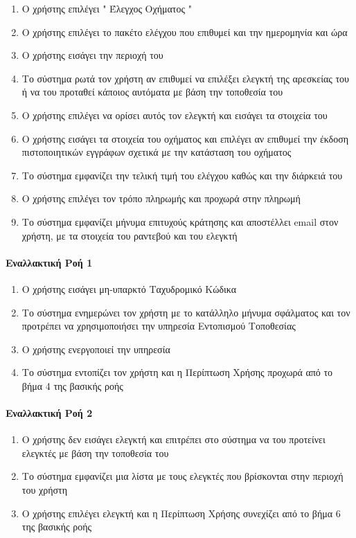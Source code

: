 \documentclass{../ol-softwaremanual}
\begin{document}
	\begin{enumerate}
		\item Ο χρήστης επιλέγει \en " \gr Έλεγχος Οχήματος \en " \gr
		\item Ο χρήστης επιλέγει το πακέτο ελέγχου που επιθυμεί και την ημερομηνία και ώρα
		\item Ο χρήστης εισάγει την περιοχή του
		\item Το σύστημα ρωτά τον χρήστη αν επιθυμεί να επιλέξει ελεγκτή της αρεσκείας του ή να του προταθεί κάποιος αυτόματα με βάση την τοποθεσία του
		\item Ο χρήστης επιλέγει να ορίσει αυτός τον ελεγκτή και εισάγει τα στοιχεία του
		\item Ο χρήστης εισάγει τα στοιχεία του οχήματος και επιλέγει αν επιθυμεί την έκδοση πιστοποιητικών εγγράφων σχετικά με την κατάσταση του οχήματος
		\item Το σύστημα εμφανίζει την τελική τιμή του ελέγχου καθώς και την διάρκειά του
		\item Ο χρήστης επιλέγει τον τρόπο πληρωμής και προχωρά στην πληρωμή 
		\item Το σύστημα εμφανίζει μήνυμα επιτυχούς κράτησης και αποστέλλει \en email \gr στον χρήστη, με τα στοιχεία του ραντεβού και του ελεγκτή		
	\end{enumerate}

	\paragraph{Εναλλακτική Ροή 1}
	
	\begin{enumerate}
		\item Ο χρήστης εισάγει μη-υπαρκτό Ταχυδρομικό Κώδικα
		\item Το σύστημα ενημερώνει τον χρήστη με το κατάλληλο μήνυμα σφάλματος και τον προτρέπει να χρησιμοποιήσει την υπηρεσία Εντοπισμού Τοποθεσίας
		\item Ο χρήστης ενεργοποιεί την υπηρεσία 
		\item Το σύστημα εντοπίζει τον χρήστη και η Περίπτωση Χρήσης προχωρά από το βήμα 4 της βασικής ροής
	\end{enumerate}

	\paragraph{Εναλλακτική Ροή 2}
	
	\begin{enumerate}
		\item Ο χρήστης δεν εισάγει ελεγκτή και επιτρέπει στο σύστημα να του προτείνει ελεγκτές με βάση την τοποθεσία του
		\item Το σύστημα εμφανίζει μια λίστα με τους ελεγκτές που βρίσκονται στην περιοχή του χρήστη
		\item Ο χρήστης επιλέγει ελεγκτή και η Περίπτωση Χρήσης συνεχίζει από το βήμα 6 της βασικής ροής
	\end{enumerate}
	
\end{document}

